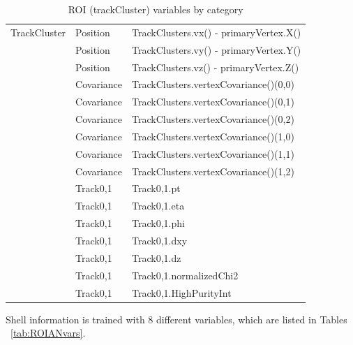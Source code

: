 \begin{table}[htb]
\caption{ROI (trackCluster) variables by category}
\begin{center}
\begin{tabular}{r|l|l}\hline
 TrackCluster & Position & TrackClusters.vx() - primaryVertex.X() \\
              & Position & TrackClusters.vy() - primaryVertex.Y() \\
              & Position & TrackClusters.vz() - primaryVertex.Z() \\
              & Covariance & TrackClusters.vertexCovariance()(0,0) \\
              & Covariance & TrackClusters.vertexCovariance()(0,1) \\
              & Covariance & TrackClusters.vertexCovariance()(0,2) \\
              & Covariance & TrackClusters.vertexCovariance()(1,0) \\
              & Covariance & TrackClusters.vertexCovariance()(1,1) \\
              & Covariance & TrackClusters.vertexCovariance()(1,2) \\
              & Track0,1 & Track0,1.pt \\
              & Track0,1 & Track0,1.eta \\
              & Track0,1 & Track0,1.phi \\
              & Track0,1 & Track0,1.dxy \\
              & Track0,1 & Track0,1.dz \\
              & Track0,1 & Track0,1.normalizedChi2 \\
              & Track0,1 & Track0,1.HighPurityInt \\
 \hline
 \hline
\end{tabular}
\label{tab:ROITCvars}
\end{center}
\end{table}



Shell information is trained with 8 different variables, which are listed in Tables ~\ref{tab:ROIANvars}.

